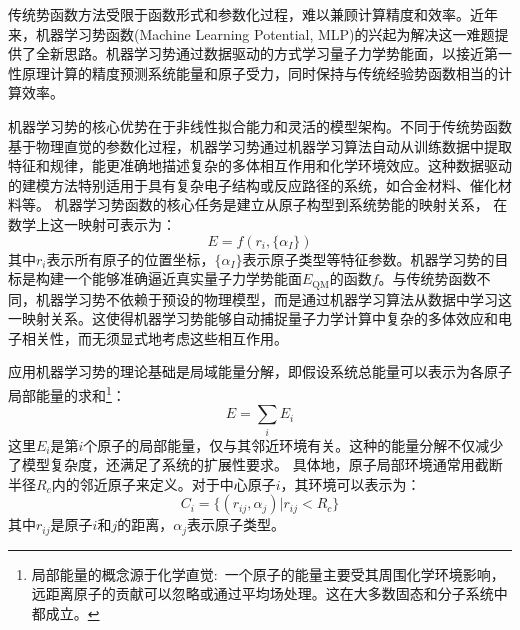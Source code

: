 传统势函数方法受限于函数形式和参数化过程，难以兼顾计算精度和效率。近年来，机器学习势函数\textrm{(Machine Learning Potential, MLP)}的兴起为解决这一难题提供了全新思路。机器学习势通过数据驱动的方式学习量子力学势能面，以接近第一性原理计算的精度预测系统能量和原子受力，同时保持与传统经验势函数相当的计算效率。

机器学习势的核心优势在于非线性拟合能力和灵活的模型架构。不同于传统势函数基于物理直觉的参数化过程，机器学习势通过机器学习算法自动从训练数据中提取特征和规律，能更准确地描述复杂的多体相互作用和化学环境效应。这种数据驱动的建模方法特别适用于具有复杂电子结构或反应路径的系统，如合金材料、催化材料等。
机器学习势函数的核心任务是建立从原子构型到系统势能的映射关系，%
在数学上这一映射可表示为：
\begin{equation}
	E = f({r_i}, \{\alpha_I\})
	\label{eq:MLP-1}
\end{equation}
其中$r_i$表示所有原子的位置坐标，$\{\alpha_I\}$表示原子类型等特征参数。机器学习势的目标是构建一个能够准确逼近真实量子力学势能面$E_{\mathrm{QM}}$的函数$f$。与传统势函数不同，机器学习势不依赖于预设的物理模型，而是通过机器学习算法从数据中学习这一映射关系。这使得机器学习势能够自动捕捉量子力学计算中复杂的多体效应和电子相关性，而无须显式地考虑这些相互作用。

应用机器学习势的理论基础是局域能量分解，即假设系统总能量可以表示为各原子局部能量的求和\footnote{局部能量的概念源于化学直觉:~一个原子的能量主要受其周围化学环境影响，远距离原子的贡献可以忽略或通过平均场处理。这在大多数固态和分子系统中都成立。}：
\begin{equation}
E = \sum_i E_i
	\label{eq:MLP-2}
\end{equation}
这里$E_i$是第$i$个原子的局部能量，仅与其邻近环境有关。这种的能量分解不仅减少了模型复杂度，还满足了系统的扩展性要求。
%
%
%
%
%
具体地，原子局部环境通常用截断半径$R_c$内的邻近原子来定义。对于中心原子$i$，其环境可以表示为：
\begin{equation}
	C_i = \{(r_{ij}, α_j) | r_{ij} < R_c\}
	\label{eq:MLP-3}
\end{equation}
其中$r_{ij}$是原子$i$和$j$的距离，$\alpha_j$表示原子类型。%

